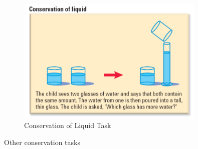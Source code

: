 \documentclass[../main/main.tex]{subfiles}
\begin{document}
\begin{description}
\begin{figure}[h!]
  \centering
  \includegraphics[width=0.8\textwidth]{../images/3-3-liq}
  \caption{Conservation of Liquid Task}
  \label{fig:3-3-liq}
\end{figure}

        Other conservation tasks

\end{description}
\end{document}
